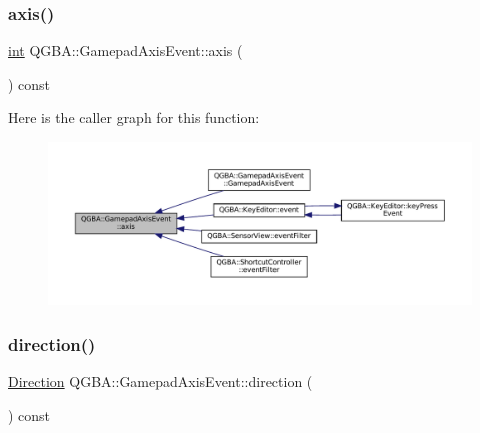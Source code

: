 \subsubsection{\texorpdfstring{axis()}{axis()}}
{\footnotesize\ttfamily \mbox{\hyperlink{ioapi_8h_a787fa3cf048117ba7123753c1e74fcd6}{int}} Q\+G\+B\+A\+::\+Gamepad\+Axis\+Event\+::axis (\begin{DoxyParamCaption}{ }\end{DoxyParamCaption}) const\hspace{0.3cm}{\ttfamily [inline]}}

Here is the caller graph for this function\+:
\nopagebreak
\begin{figure}[H]
\begin{center}
\leavevmode
\includegraphics[width=350pt]{class_q_g_b_a_1_1_gamepad_axis_event_a9f6eb219e344d8added3dbc3867a84fb_icgraph}
\end{center}
\end{figure}
\mbox{\label{class_q_g_b_a_1_1_gamepad_axis_event_aa4348e9085dd4cd22d9b0f84a033a3d5}} 
\subsubsection{\texorpdfstring{direction()}{direction()}}
{\footnotesize\ttfamily \mbox{\hyperlink{class_q_g_b_a_1_1_gamepad_axis_event_a5d50ab74dce4e58252f2affb5f227bbc}{Direction}} Q\+G\+B\+A\+::\+Gamepad\+Axis\+Event\+::direction (\begin{DoxyParamCaption}{ }\end{DoxyParamCaption}) const\hspace{0.3cm}{\ttfamily [inline]}}

